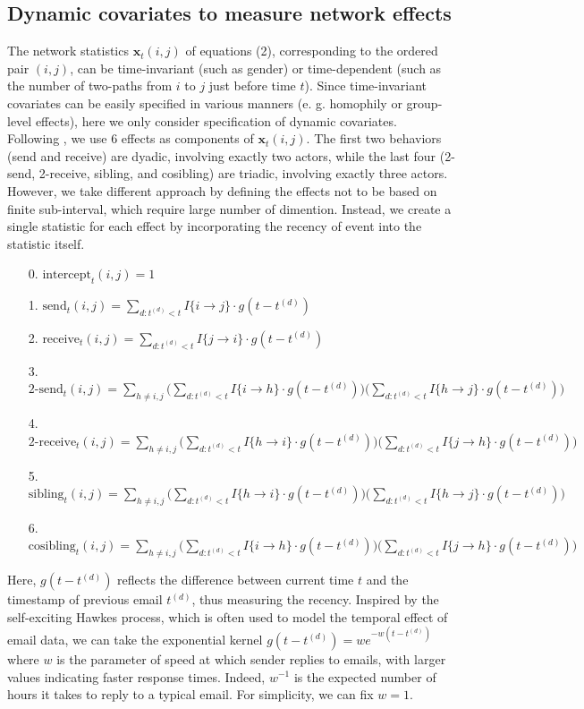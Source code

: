 \documentclass[a4paper]{article}
\begin{document}
 \normalsize
\subsection{Dynamic covariates to measure network effects}
The network statistics $\boldsymbol{x}_t(i, j)$ of equations (2), corresponding to the ordered pair $(i, j)$, can be time-invariant (such as gender) or time-dependent (such as the number of two-paths from $i$ to $j$ just before time $t$). Since time-invariant covariates can be easily specified in various manners (e. g. homophily or group-level effects), here we only consider specification of dynamic covariates.\\ \newline
Following \cite{PerryWolfe2012}, we use 6 effects as components of $\boldsymbol{x}_t(i, j)$. The first two behaviors (send and receive) are dyadic, involving exactly two actors,
while the last four (2-send, 2-receive, sibling, and cosibling) are triadic, involving exactly three actors. However, we take different approach by defining the effects not to be based on finite sub-interval, which require large number of dimention. Instead, we create a single statistic for each effect by incorporating the recency of event into the statistic itself. 
\begin{itemize}[leftmargin=*,rightmargin=-1cm ]
\item [0.] $\mbox{intercept}_t(i, j) = 1$
\item [1.]  $\mbox{send}_t(i, j)=\sum\limits_{d: t^{(d)}<t} I\{i\rightarrow j\}\cdot g(t-t^{(d)})$
\item [2.] $\mbox{receive}_t(i, j)=\sum\limits_{d: t^{(d)}<t} I\{j\rightarrow i\}\cdot g(t-t^{(d)})$
\item [3.] $\mbox{2-send}_t(i, j)=\sum\limits_{h \neq i, j}\Big(\sum\limits_{d: t^{(d)}<t}  I\{i\rightarrow h\}\cdot g(t-t^{(d)})\Big)\Big(\sum\limits_{d: t^{(d)}<t} I\{h\rightarrow j\}\cdot g(t-t^{(d)})\Big)$
\item [4.]  $\mbox{2-receive}_t(i, j)=\sum\limits_{h \neq i, j}\Big(\sum\limits_{d: t^{(d)}<t} I\{h\rightarrow i\}\cdot g(t-t^{(d)})\Big)\Big(\sum\limits_{d: t^{(d)}<t} I\{j\rightarrow h\}\cdot g(t-t^{(d)})\Big)$
\item [5.] $\mbox{sibling}_t(i, j)=\sum\limits_{h \neq i, j}\Big(\sum\limits_{d: t^{(d)}<t} I\{h\rightarrow i\}\cdot g(t-t^{(d)})\Big)\Big(\sum\limits_{d: t^{(d)}<t} I\{h\rightarrow j\}\cdot g(t-t^{(d)})\Big)$
\item [6.] $\mbox{cosibling}_t(i, j)=\sum\limits_{h \neq i, j}\Big(\sum\limits_{d: t^{(d)}<t} I\{i\rightarrow h\}\cdot g(t-t^{(d)})\Big)\Big(\sum\limits_{d: t^{(d)}<t} I\{j\rightarrow h\}\cdot g(t-t^{(d)})\Big)$
\end{itemize}
Here, $g(t-t^{(d)})$ reflects the difference between current time $t$ and the timestamp of previous email $t^{(d)}$, thus measuring the recency. Inspired by the self-exciting Hawkes process, which is often used to model the temporal effect of email data, we can take the exponential kernel $g(t-t^{(d)})=we^{-w(t-t^{(d)})}$ where $w$ is the parameter of speed at
which sender replies to emails, with larger values indicating faster response times. Indeed, $w^{-1}$ is the expected number of hours it takes to reply to a typical email. For simplicity, we can fix $w=1$.
\end{document}
